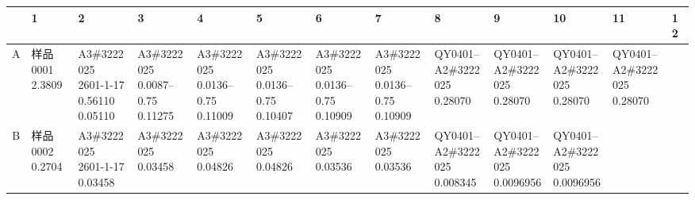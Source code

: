 \documentclass[UTF8,10pt,a4paper,fontset=fandol]{ctexart}
\begin{document}
\begin{center}
\scriptsize
\begin{tabular}{c|*{12}{p{0.55cm}|}}
 & 1 & 2 & 3 & 4 & 5 & 6 & 7 & 8 & 9 & 10 & 11 & 12\\ \hline
A &
\shortstack{样品0001\\2.3809} &
\shortstack{A3\#3222025\\2601-1-17\\0.56110\\0.05110} &
\shortstack{A3\#3222025\\0.0087--0.75\\0.11275} &
\shortstack{A3\#3222025\\0.0136--0.75\\0.11009} &
\shortstack{A3\#3222025\\0.0136--0.75\\0.10407} &
\shortstack{A3\#3222025\\0.0136--0.75\\0.10909} &
\shortstack{A3\#3222025\\0.0136--0.75\\0.10909} &
\shortstack{QY0401--\\A2\#3222025\\0.28070} &
\shortstack{QY0401--\\A2\#3222025\\0.28070} &
\shortstack{QY0401--\\A2\#3222025\\0.28070} &
\shortstack{QY0401--\\A2\#3222025\\0.28070} &
\\ \hline
B &
\shortstack{样品0002\\0.2704} &
\shortstack{A3\#3222025\\2601-1-17\\0.03458} &
\shortstack{A3\#3222025\\0.03458} &
\shortstack{A3\#3222025\\0.04826} &
\shortstack{A3\#3222025\\0.04826} &
\shortstack{A3\#3222025\\0.03536} &
\shortstack{A3\#3222025\\0.03536} &
\shortstack{QY0401--\\A2\#3222025\\0.008345} &
\shortstack{QY0401--\\A2\#3222025\\0.0096956} &
\shortstack{QY0401--\\A2\#3222025\\0.0096956} &

\end{tabular}
\end{center}
\end{document}

